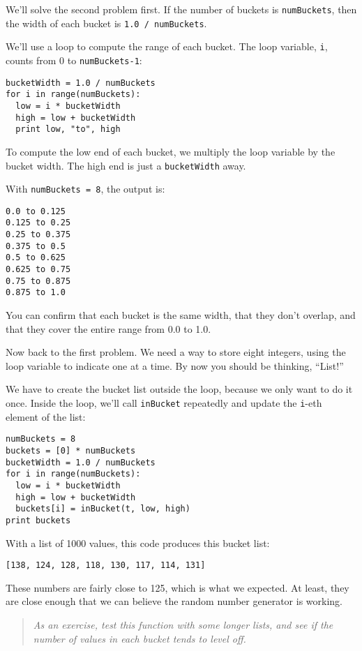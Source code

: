 We'll solve the second problem first.  If the number of buckets
is {\tt numBuckets}, then the width of each bucket is
{\tt 1.0 / numBuckets}.

We'll use a loop to compute the range of each bucket.
The loop variable, {\tt i},
counts from 0 to {\tt numBuckets-1}:

\beforeverb
\begin{verbatim}
bucketWidth = 1.0 / numBuckets
for i in range(numBuckets):
  low = i * bucketWidth
  high = low + bucketWidth
  print low, "to", high
\end{verbatim}
\afterverb
%
To compute the low end of each bucket, we multiply the loop variable
by the bucket width.  The high end is just a {\tt bucketWidth} away.

With {\tt numBuckets = 8}, the output is:

\beforeverb
\begin{verbatim}
0.0 to 0.125
0.125 to 0.25
0.25 to 0.375
0.375 to 0.5
0.5 to 0.625
0.625 to 0.75
0.75 to 0.875
0.875 to 1.0
\end{verbatim}
\afterverb
%
You can confirm that each bucket is the same width, that they don't
overlap, and that they cover the entire range from 0.0 to 1.0.

Now back to the first problem.
We need a way to store eight integers, using the loop variable
to indicate one at a time.  By now you should be thinking,
``List!''

We have to create the bucket list outside the loop, because we only
want to do it once.  Inside the loop, we'll call {\tt inBucket}
repeatedly and update the {\tt i}-eth element of the list:

\beforeverb
\begin{verbatim}
numBuckets = 8
buckets = [0] * numBuckets
bucketWidth = 1.0 / numBuckets
for i in range(numBuckets):
  low = i * bucketWidth
  high = low + bucketWidth
  buckets[i] = inBucket(t, low, high)
print buckets
\end{verbatim}
\afterverb
%
With a list of 1000 values, this code produces this bucket list:

\beforeverb
\begin{verbatim}
[138, 124, 128, 118, 130, 117, 114, 131]
\end{verbatim}
\afterverb
%
These numbers are fairly close to 125, which is what we expected.  At
least, they are close enough that we can believe the random number
generator is working.

\begin{quote}
{\em As an exercise, 
test this function with some longer lists, and see if the
number of values in each bucket tends to level off.}
\end{quote}


